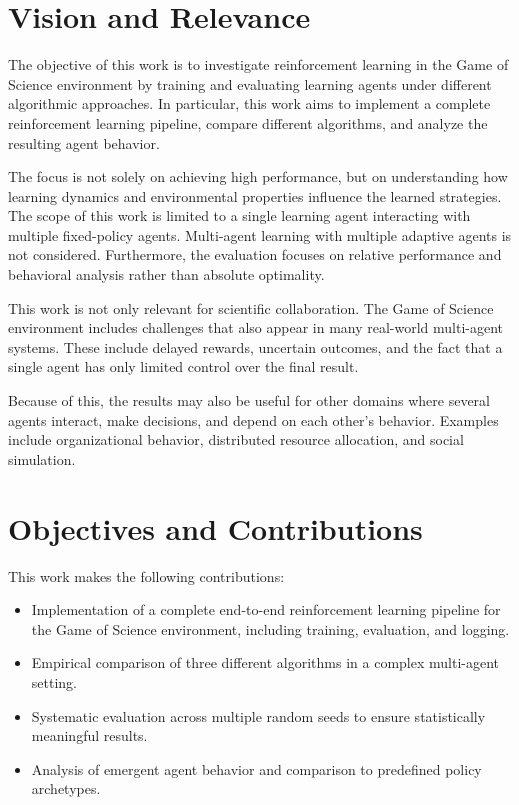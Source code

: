 \documentclass[english,bachelor]{hsluthesis}
\begin{document}
\section{Vision and Relevance}
The objective of this work is to investigate reinforcement learning in the Game of Science environment by training and evaluating learning agents under different algorithmic approaches. In particular, this work aims to implement a complete reinforcement learning pipeline, compare different algorithms, and analyze the resulting agent behavior.

The focus is not solely on achieving high performance, but on understanding how learning dynamics and environmental properties influence the learned strategies.
The scope of this work is limited to a single learning agent interacting with multiple fixed-policy agents. Multi-agent learning with multiple adaptive agents is not considered. Furthermore, the evaluation focuses on relative performance and behavioral analysis rather than absolute optimality.

This work is not only relevant for scientific collaboration. The Game of Science environment includes challenges that also appear in many real-world multi-agent systems. These include delayed rewards, uncertain outcomes, and the fact that a single agent has only limited control over the final result.

Because of this, the results may also be useful for other domains where several agents interact, make decisions, and depend on each other's behavior. Examples include organizational behavior, distributed resource allocation, and social simulation.

\section{Objectives and Contributions}
This work makes the following contributions:
\begin{itemize}
    \item Implementation of a complete end-to-end reinforcement learning pipeline for the Game of Science environment, including training, evaluation, and logging.
    \item Empirical comparison of three different algorithms in a complex multi-agent setting.
    \item Systematic evaluation across multiple random seeds to ensure statistically meaningful results.
    \item Analysis of emergent agent behavior and comparison to predefined policy archetypes.
\end{itemize}
\end{document}
